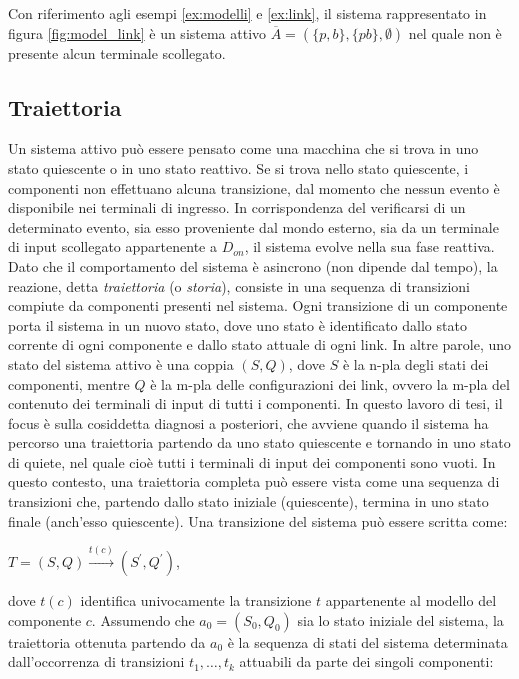 \begin{ex} \label{ex:sa}
Con riferimento agli esempi \ref{ex:modelli} e \ref{ex:link}, il sistema rappresentato in figura \ref{fig:model_link} è un sistema attivo $\overline A = (\{p,b\},\{pb\},\emptyset)$ nel quale non è presente alcun terminale scollegato.
\end{ex}

\subsection{Traiettoria}
Un sistema attivo può essere pensato come una macchina che si trova in uno stato quiescente o in uno stato reattivo. Se si trova nello stato quiescente, i componenti non effettuano alcuna transizione, dal momento che nessun evento è disponibile nei terminali di ingresso. In corrispondenza del verificarsi di un determinato evento, sia esso proveniente dal mondo esterno, sia da un terminale di input scollegato appartenente a $D_\mathit{on}$, il sistema evolve nella sua fase reattiva. Dato che il comportamento del sistema è asincrono (non dipende dal tempo), la reazione, detta \emph{traiettoria} (o \emph{storia}), consiste in una sequenza di transizioni compiute da componenti presenti nel sistema.
Ogni transizione di un componente porta il sistema in un nuovo stato, dove uno stato è identificato dallo stato corrente di ogni componente e dallo stato attuale di ogni link. In altre parole, uno stato del sistema attivo è una coppia $(S,Q)$, dove $S$ è la n-pla degli stati dei componenti, mentre $Q$ è la m-pla delle configurazioni dei link, ovvero la m-pla del contenuto dei terminali di input di tutti i componenti.
In questo lavoro di tesi, il focus è sulla cosiddetta diagnosi a posteriori, che avviene quando il sistema ha percorso una traiettoria partendo da uno stato quiescente e tornando in uno stato di quiete, nel quale cioè tutti i terminali di input dei componenti sono vuoti. In questo contesto, una traiettoria completa può essere vista come una sequenza di transizioni che, partendo dallo stato iniziale (quiescente), termina in uno stato finale (anch'esso quiescente).
Una transizione del sistema può essere scritta come:
\begin{center}
	$T = (S,Q) \xrightarrow {t(c)} (S^\prime,Q^\prime)$,
\end{center}
dove $t(c)$ identifica univocamente la transizione $t$ appartenente al modello del componente $c$.
Assumendo che $a_0 = (S_0,Q_0)$ sia lo stato iniziale del sistema, la traiettoria ottenuta partendo da $a_0$ è la sequenza di stati del sistema determinata dall'occorrenza di transizioni $t_1, \ldots , t_k$ attuabili da parte dei singoli componenti:

